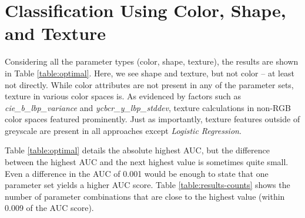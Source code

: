 \documentclass[letterpaper]{report}
\begin{document}
\section{Classification Using Color, Shape, and Texture}
Considering all the parameter types (color, shape, texture), the results are shown in Table \ref{table:optimal}. Here, we see shape and texture, but not color -- at least not directly. While color attributes are not present in any of the parameter sets, texture in various color spaces is. As evidenced by factors such as \textit{cie\_b\_lbp\_variance} and \textit{ycbcr\_y\_lbp\_stddev}, texture calculations in non-RGB color spaces featured prominently. Just as importantly, texture features outside of greyscale are present in all approaches except \textit{Logistic Regression}.

{
\renewcommand{\arraystretch}{0.9}

}

Table \ref{table:optimal} details the absolute highest AUC, but the difference between the highest AUC and the next highest value is sometimes quite small. Even a difference in the AUC of 0.001 would be enough to state that one parameter set yields a higher AUC score. Table \ref{table:results-counts} shows the number of parameter combinations that are close to the highest value (within 0.009 of the AUC score).

{


}
\end{document}
